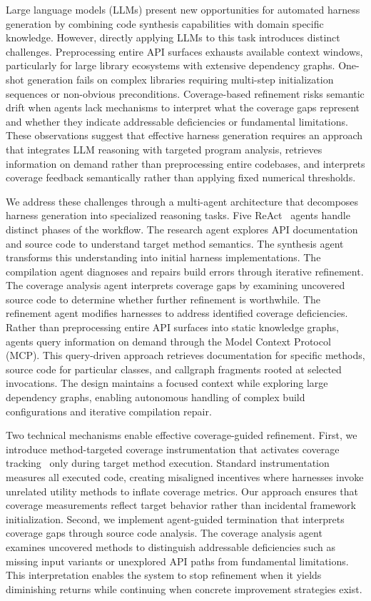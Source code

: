 Large language models (LLMs) present new opportunities for automated harness generation by combining code synthesis capabilities with domain specific knowledge. However, directly applying LLMs to this task introduces distinct challenges. Preprocessing entire API surfaces exhausts available context windows, particularly for large library ecosystems with extensive dependency graphs. One-shot generation fails on complex libraries requiring multi-step initialization sequences or non-obvious preconditions. Coverage-based refinement risks semantic drift when agents lack mechanisms to interpret what the coverage gaps represent and whether they indicate addressable deficiencies or fundamental limitations. These observations suggest that effective harness generation requires an approach that integrates LLM reasoning with targeted program analysis, retrieves information on demand rather than preprocessing entire codebases, and interprets coverage feedback semantically rather than applying fixed numerical thresholds.

We address these challenges through a multi-agent architecture that decomposes harness generation into specialized reasoning tasks. Five ReAct~\cite{DBLP:conf/iclr/YaoZYDSN023:ReAct} agents handle distinct phases of the workflow. The research agent explores API documentation and source code to understand target method semantics. The synthesis agent transforms this understanding into initial harness implementations. The compilation agent diagnoses and repairs build errors through iterative refinement. The coverage analysis agent interprets coverage gaps by examining uncovered source code to determine whether further refinement is worthwhile. The refinement agent modifies harnesses to address identified coverage deficiencies. Rather than preprocessing entire API surfaces into static knowledge graphs, agents query information on demand through the Model Context Protocol~\cite{mcp} (MCP). This query-driven approach retrieves documentation for specific methods, source code for particular classes, and callgraph fragments rooted at selected invocations. The design maintains a focused context while exploring large dependency graphs, enabling autonomous handling of complex build configurations and iterative compilation repair.

Two technical mechanisms enable effective coverage-guided refinement. First, we introduce method-targeted coverage instrumentation that activates coverage tracking~\cite{jacoco} only during target method execution. Standard instrumentation measures all executed code, creating misaligned incentives where harnesses invoke unrelated utility methods to inflate coverage metrics. Our approach ensures that coverage measurements reflect target behavior rather than incidental framework initialization. Second, we implement agent-guided termination that interprets coverage gaps through source code analysis. The coverage analysis agent examines uncovered methods to distinguish addressable deficiencies such as missing input variants or unexplored API paths from fundamental limitations. This interpretation enables the system to stop refinement when it yields diminishing returns while continuing when concrete improvement strategies exist.

